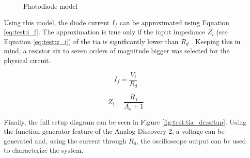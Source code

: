 \begin{figure}[ht]
	\centering
	\caption{Photodiode model}
	\label{fig:test:diode_equiv}
\end{figure}

Using this model, the diode current $I_f$ can be approximated using Equation \eqref{eq:test:i_f}. The approximation is true only if the input impedance $Z_i$ (see Equation \eqref{eq:test:z_i}) of the \gls{tia} is significantly lower than $R_d$ \cite{razavi2019transimpedance}. Keeping this in mind, a resistor six to seven orders of magnitude bigger was selected for the physical circuit.

\begin{equation}\label{eq:test:i_f}
	I_f = \frac{V_i}{R_d}
\end{equation}

\begin{equation}\label{eq:test:z_i}
	Z_i = \frac{R_1}{A_o + 1}
\end{equation}

Finally, the full setup diagram can be seen in Figure \ref{fig:test:tia_dc:setup}. Using the function generator feature of the Analog Discovery 2, a voltage can be generated and, using the current through $R_d$, the oscilloscope output can be used to characterize the system.

